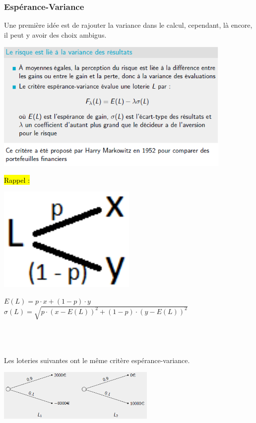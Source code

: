 \documentclass[a4paper, 12pt]{article}
\begin{document}
		\subsubsection{Espérance-Variance}
			Une première idée est de rajouter la variance dans le calcul, cependant, là encore, il peut y avoir des choix ambigus.
			\begin{center}
				\includegraphics[width=4.5in]{Images/markowitz}
			\end{center}
			\hl{Rappel :} \\
			\begin{minipage}{0.24\textwidth}
				\includegraphics[width=0.5\textwidth]{Images/loteries3}
			\end{minipage}\hfill
			\begin{minipage}{0.75\textwidth}
				$ E(L) = p\cdot x + (1 - p) \cdot y $ ~\\
				$ \sigma(L) = \sqrt{p \cdot (x - E(L))^2 + (1 - p) \cdot (y - E(L))^2} $
			\end{minipage}~\\~\\~\\
			Les loteries suivantes ont le même critère espérance-variance.
			\begin{center}
				\includegraphics[width=3in]{Images/loteries2}
			\end{center}
\end{document}

